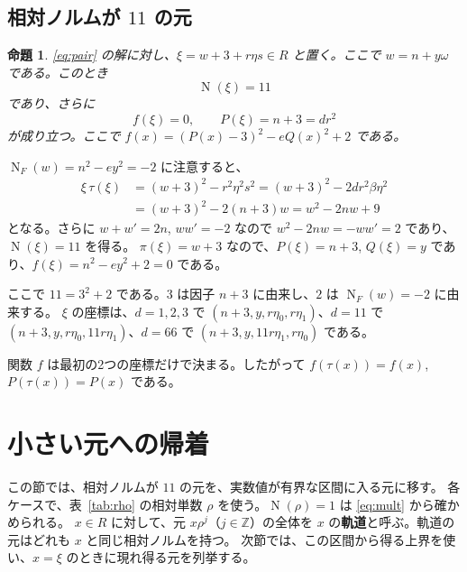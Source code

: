 \documentclass[a4paper,11pt]{ltjsarticle}
\makeatletter
\theoremstyle{jplain}
\newtheorem{proposition}[theorem]{命題}
\renewcommand{\proofname}{証明}
\renewenvironment{proof}[1][\proofname]{\par\pushQED{\qed}\normalfont\topsep6\p@\@plus6\p@\relax
  \trivlist\item[\hskip\labelsep\bfseries #1]\ignorespaces}{\popQED\endtrivlist\@endpefalse}
\numberwithin{equation}{section}
\numberwithin{table}{section}
\newcommand{\Z}{\mathbb{Z}}
\newcommand{\Nm}{\operatorname{N}}
\newcommand{\NF}{\operatorname{N}_F}
\newcommand{\tsec}[2]{\texorpdfstring{#1}{#2}}
\makeatother
\begin{document}
\subsection{相対ノルムが \tsec{$11$}{11} の元}

\begin{proposition}\label{prop:xi}
\eqref{eq:pair} の解に対し、$\xi=w+3+r\eta s\in R$ と置く。ここで $w=n+y\omega$ である。このとき
\begin{equation}\label{eq:norm11}
\Nm(\xi)=11
\end{equation}
であり、さらに
\begin{equation}\label{eq:f}
f(\xi)=0,\qquad P(\xi)=n+3=dr^2
\end{equation}
が成り立つ。ここで $f(x)=(P(x)-3)^2-eQ(x)^2+2$ である。
\end{proposition}

\begin{proof}
$\NF(w)=n^2-ey^2=-2$ に注意すると、
\begin{align*}
\xi\,\tau(\xi)&=(w+3)^2-r^2\eta^2s^2=(w+3)^2-2dr^2\beta\eta^2\\
&=(w+3)^2-2(n+3)w=w^2-2nw+9
\end{align*}
となる。さらに $w+w'=2n$, $ww'=-2$ なので $w^2-2nw=-ww'=2$ であり、$\Nm(\xi)=11$ を得る。
$\pi(\xi)=w+3$ なので、$P(\xi)=n+3$, $Q(\xi)=y$ であり、$f(\xi)=n^2-ey^2+2=0$ である。
\end{proof}

ここで $11=3^2+2$ である。$3$ は因子 $n+3$ に由来し、$2$ は $\NF(w)=-2$ に由来する。
$\xi$ の座標は、$d=1,2,3$ で $(n+3,y,r\eta_0,r\eta_1)$、$d=11$ で $(n+3,y,r\eta_0,11r\eta_1)$、$d=66$ で $(n+3,y,11r\eta_1,r\eta_0)$ である。

関数 $f$ は最初の2つの座標だけで決まる。したがって $f(\tau(x))=f(x)$, $P(\tau(x))=P(x)$ である。

\section{小さい元への帰着}\label{sec:window}

この節では、相対ノルムが $11$ の元を、実数値が有界な区間に入る元に移す。
各ケースで、表~\ref{tab:rho} の相対単数 $\rho$ を使う。$\Nm(\rho)=1$ は \eqref{eq:mult} から確かめられる。
$x\in R$ に対して、元 $x\rho^j$（$j\in\Z$）の全体を $x$ の\textbf{軌道}と呼ぶ。軌道の元はどれも $x$ と同じ相対ノルムを持つ。
次節では、この区間から得る上界を使い、$x=\xi$ のときに現れ得る元を列挙する。
\end{document}
